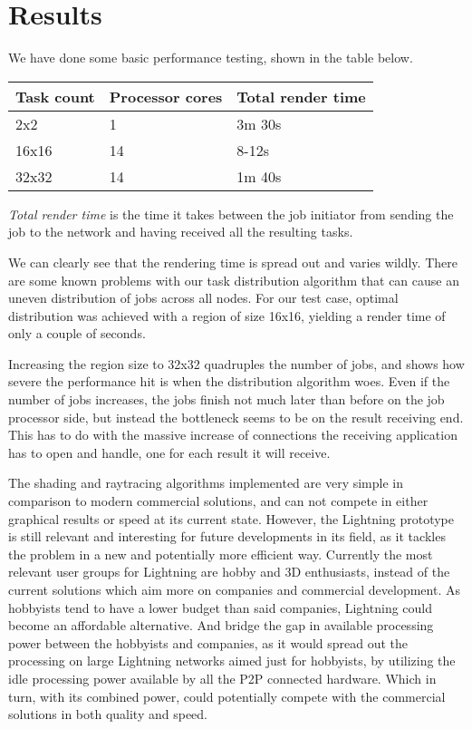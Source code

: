 \chapter{Results}
We have done some basic performance testing, shown in the table below.

\begin{center}
    \begin{tabular}{ | l | l | l |} \hline
    Task count & Processor cores & Total render time \\ \hline
    2x2 & 1 & 3m 30s \\ \hline
    16x16 & 14 & 8-12s \\ \hline
    32x32 & 14 & 1m 40s \\ \hline
    \end{tabular}
    
    \emph{Total render time} is the time it takes between the job initiator from sending the job to the network and having received all the resulting tasks.
\end{center}

We can clearly see that the rendering time is spread out and varies wildly. There are
some known problems with our task distribution algorithm that can cause an uneven distribution
of jobs across all nodes. For our test case, optimal distribution was achieved with a region of size 16x16, yielding a render time of only a couple of seconds.

Increasing the region size to 32x32 quadruples the number of jobs, and shows how severe the performance hit is
when the distribution algorithm woes. Even if the number of jobs increases, the jobs finish not much later than before on the job processor side, but instead the bottleneck seems to be on the result receiving end. This has to do with the massive increase of connections the receiving application has to open and handle, one for each result it will receive.

The shading and raytracing algorithms implemented are very simple in comparison to modern commercial solutions, and can not compete in either graphical results or speed at its current state. However, the Lightning prototype is still relevant and interesting for future developments in its field, as it tackles the problem in a new and potentially more efficient way. Currently the most relevant user groups for Lightning are hobby and 3D enthusiasts, instead of the current solutions which aim more on companies and commercial development. As hobbyists tend to have a lower budget than said companies, Lightning could become an affordable alternative. And bridge the gap in available processing power between the hobbyists and companies, as it would spread out the processing on large Lightning networks aimed just for hobbyists, by utilizing the idle processing power available by all the P2P connected hardware. Which in turn, with its combined power, could potentially compete with the commercial solutions in both quality and speed.

